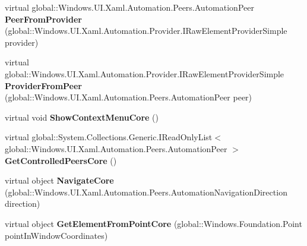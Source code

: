 \begin{DoxyCompactItemize}
virtual global\+::\+Windows.\+U\+I.\+Xaml.\+Automation.\+Peers.\+Automation\+Peer {\bfseries Peer\+From\+Provider} (global\+::\+Windows.\+U\+I.\+Xaml.\+Automation.\+Provider.\+I\+Raw\+Element\+Provider\+Simple provider)
\item 
\mbox{\label{class_windows_1_1_u_i_1_1_xaml_1_1_automation_1_1_peers_1_1_automation_peer_a8d1ce21375148b3c860bc66fa5df87fa}} 
virtual global\+::\+Windows.\+U\+I.\+Xaml.\+Automation.\+Provider.\+I\+Raw\+Element\+Provider\+Simple {\bfseries Provider\+From\+Peer} (global\+::\+Windows.\+U\+I.\+Xaml.\+Automation.\+Peers.\+Automation\+Peer peer)
\item 
\mbox{\label{class_windows_1_1_u_i_1_1_xaml_1_1_automation_1_1_peers_1_1_automation_peer_a4cf8c7b7bc669694fbf6115b9d508e66}} 
virtual void {\bfseries Show\+Context\+Menu\+Core} ()
\item 
\mbox{\label{class_windows_1_1_u_i_1_1_xaml_1_1_automation_1_1_peers_1_1_automation_peer_a7554757fd9d004f2179de9d68645070c}} 
virtual global\+::\+System.\+Collections.\+Generic.\+I\+Read\+Only\+List$<$ global\+::\+Windows.\+U\+I.\+Xaml.\+Automation.\+Peers.\+Automation\+Peer $>$ {\bfseries Get\+Controlled\+Peers\+Core} ()
\item 
\mbox{\label{class_windows_1_1_u_i_1_1_xaml_1_1_automation_1_1_peers_1_1_automation_peer_afd50c2697f066ad333995dc06a907be4}} 
virtual object {\bfseries Navigate\+Core} (global\+::\+Windows.\+U\+I.\+Xaml.\+Automation.\+Peers.\+Automation\+Navigation\+Direction direction)
\item 
\mbox{\label{class_windows_1_1_u_i_1_1_xaml_1_1_automation_1_1_peers_1_1_automation_peer_ae8260393672adea30e509cee8106d5ef}} 
virtual object {\bfseries Get\+Element\+From\+Point\+Core} (global\+::\+Windows.\+Foundation.\+Point point\+In\+Window\+Coordinates)
\item 
\mbox{\label{class_windows_1_1_u_i_1_1_xaml_1_1_automation_1_1_peers_1_1_automation_peer_afadb1e1f2c9abb79fa5e7189b24f159c}} 

\end{DoxyCompactItemize}

